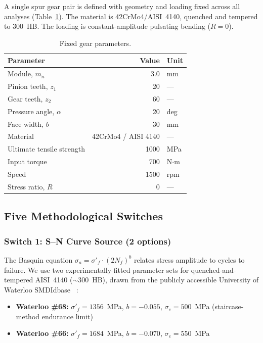 \documentclass[12pt,a4paper]{article}
\begin{document}
A single spur gear pair is defined with geometry and loading fixed
across all analyses (Table~\ref{tab:gear}). The material is
42CrMo4/AISI~4140, quenched and tempered to 300~HB. The loading is
constant-amplitude pulsating bending ($R=0$).

\begin{table}[h]
\centering
\caption{Fixed gear parameters.}
\label{tab:gear}
\begin{tabular}{lrl}
\toprule
Parameter & Value & Unit \\
\midrule
Module, $m_n$ & 3.0 & mm \\
Pinion teeth, $z_1$ & 20 & --- \\
Gear teeth, $z_2$ & 60 & --- \\
Pressure angle, $\alpha$ & 20 & deg \\
Face width, $b$ & 30 & mm \\
Material & 42CrMo4 / AISI 4140 & --- \\
Ultimate tensile strength & 1000 & MPa \\
Input torque & 700 & N$\cdot$m \\
Speed & 1500 & rpm \\
Stress ratio, $R$ & 0 & --- \\
\bottomrule
\end{tabular}
\end{table}

\subsection{Five Methodological Switches}

\subsubsection{Switch 1: S--N Curve Source (2 options)}

The Basquin equation $\sigma_a = \sigma'_f \cdot (2N_f)^b$ relates
stress amplitude to cycles to failure. We use two experimentally-fitted
parameter sets for quenched-and-tempered AISI~4140 ($\sim$300~HB),
drawn from the publicly accessible University of Waterloo SMDIdbase%
~\cite{waterloo_fde}:

\begin{itemize}
  \item \textbf{Waterloo \#68:} $\sigma'_f = 1356$~MPa, $b=-0.055$,
        $\sigma_e=500$~MPa (staircase-method endurance limit)
  \item \textbf{Waterloo \#66:} $\sigma'_f = 1684$~MPa, $b=-0.070$,
        $\sigma_e=550$~MPa
\end{itemize}
\end{document}
